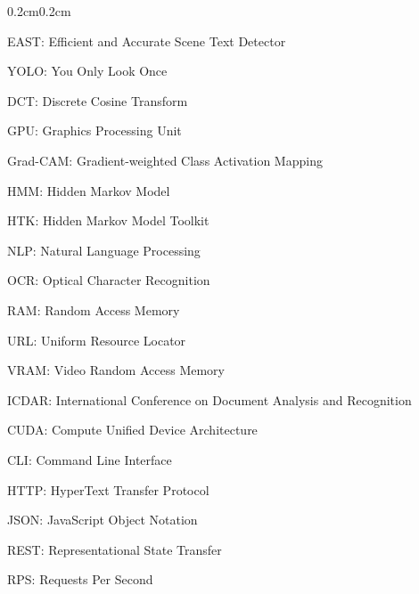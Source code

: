 \begin{adjustwidth}{0.2cm}{0.2cm}
    {\large EAST: Efficient and Accurate Scene Text Detector\dotfill\par}
    {\large YOLO: You Only Look Once\dotfill\par}
    
    {\large DCT: Discrete Cosine Transform\dotfill\par}
    {\large GPU: Graphics Processing Unit\dotfill\par}
    {\large Grad-CAM: Gradient-weighted Class Activation Mapping\dotfill\par}
    {\large HMM: Hidden Markov Model\dotfill\par}
    {\large HTK: Hidden Markov Model Toolkit\dotfill\par}
    {\large NLP: Natural Language Processing\dotfill\par}
    {\large OCR: Optical Character Recognition\dotfill\par}
    {\large RAM: Random Access Memory\dotfill\par}
    {\large URL: Uniform Resource Locator\dotfill\par}
    {\large VRAM: Video Random Access Memory\dotfill\par}
    
    {\large ICDAR: International Conference on Document Analysis and Recognition\dotfill\par}
    
    {\large CUDA: Compute Unified Device Architecture\dotfill\par}
    {\large CLI: Command Line Interface\dotfill\par}
    {\large HTTP: HyperText Transfer Protocol\dotfill\par}
    {\large JSON: JavaScript Object Notation\dotfill\par}
    {\large REST: Representational State Transfer\dotfill\par}
    {\large RPS: Requests Per Second\dotfill\par}

\end{adjustwidth}